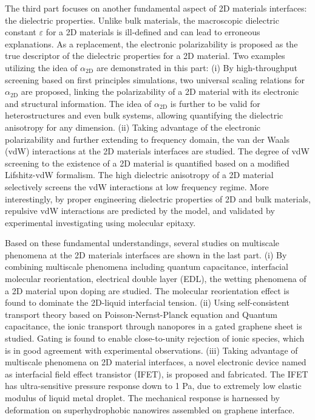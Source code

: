 The third part focuses on another fundamental aspect of 2D materials
interfaces: the dielectric properties.
%
Unlike bulk materials, the
macroscopic dielectric constant $\varepsilon$ for a 2D materials is
ill-defined and can lead to erroneous explanations.
%
As a replacement,
the electronic polarizability is proposed as the true descriptor of
the dielectric properties for a 2D material.
%
Two examples utilizing the idea of $\alpha_{\mathrm{2D}}$ are
demonstrated in this part:
%
(i) By high-throughput screening based on first principles
simulations, two universal scaling relations for
$\alpha_{\mathrm{2D}}$ are proposed, linking the polarizability of a
2D material with its electronic and structural information.
%
The idea
of $\alpha_{\mathrm{2D}}$ is further to be valid for heterostructures
and even bulk systems, allowing quantifying the dielectric anisotropy
for any dimension.
%
(ii) Taking advantage of the electronic polarizability and further
extending to frequency domain, the van der Waals (vdW) interactions at
the 2D materials interfaces are studied. The degree of vdW screening
to the existence of a 2D material is quantified based on a modified
Lifshitz-vdW formalism. The high dielectric anisotropy of a 2D
material selectively screens the vdW interactions at low frequency
regime. More interestingly, by proper engineering dielectric
properties of 2D and bulk materials, repulsive vdW interactions are
predicted by the model, and validated by experimental investigating
using molecular epitaxy.

Based on these fundamental understandings, several
studies on multiscale phenomena at the 2D materials interfaces are
shown in the last part.
%
(i) By combining multiscale phenomena including quantum capacitance,
interfacial molecular reorientation, electrical double layer (EDL),
the wetting phenomena of a 2D material upon doping are studied. The
molecular reorientation effect is found to dominate the 2D-liquid
interfacial tension.
%
(ii) Using self-consistent transport theory based on
Poisson-Nernst-Planck equation and Quantum capacitance, the ionic
transport through nanopores in a gated graphene sheet is
studied. Gating is found to enable close-to-unity rejection of ionic
species, which is in good agreement with experimental observations.
%
(iii) Taking advantage of multiscale phenomena on 2D material
interfaces, a novel electronic device named as interfacial field
effect transistor (IFET), is proposed and fabricated. The IFET has
ultra-sensitive pressure response down to 1 Pa, due to extremely low
elastic modulus of liquid metal droplet. The mechanical response is
harnessed by deformation on superhydrophobic nanowires assembled on
graphene interface.

